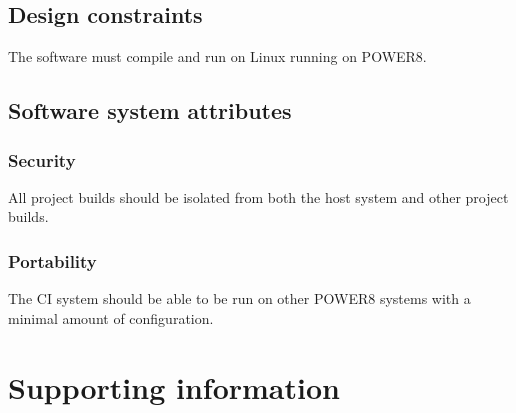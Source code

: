 \documentclass[10pt,letterpaper,onecolumn,draftclsnofoot]{IEEEtran}
\begin{document}
\subsection{Design constraints}
The software must compile and run on Linux running on POWER8.
\subsection{Software system attributes}
\subsubsection{Security}
All project builds should be isolated from both the host system and other project builds.
\subsubsection{Portability}
The CI system should be able to be run on other POWER8 systems with a minimal amount of configuration.

\section{Supporting information}

\tableofcontents

\clearpage
\end{document}
